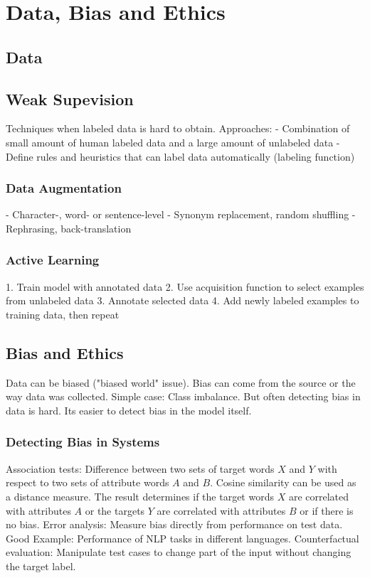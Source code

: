 \documentclass{scrartcl}
\begin{document}
\section*{Data, Bias and Ethics}
\subsection*{Data}
\subsection*{Weak Supevision}
Techniques when labeled data is hard to obtain.
Approaches:
- Combination of small amount of human labeled data and a large amount of unlabeled data
- Define rules and heuristics that can label data automatically (labeling function)

\subsubsection*{Data Augmentation}
- Character-, word- or sentence-level
- Synonym replacement, random shuffling
- Rephrasing, back-translation

\subsubsection*{Active Learning}
1. Train model with annotated data
2. Use acquisition function to select examples from unlabeled data
3. Annotate selected data
4. Add newly labeled examples to training data, then repeat

\subsection*{Bias and Ethics}
Data can be biased ("biased world" issue). Bias can come from the source or the way data was collected. Simple case: Class imbalance. But often detecting bias in data is hard. Its easier to detect bias in the model itself.
\subsubsection*{Detecting Bias in Systems}
Association tests:
Difference between two sets of target words $X$ and $Y$ with respect to two sets of attribute words $A$ and $B$. Cosine similarity can be used as a distance measure. The result determines if the target words $X$ are correlated with attributes $A$ or the targets $Y$ are correlated with attributes $B$ or if there is no bias.
Error analysis:
Measure bias directly from performance on test data. Good Example: Performance of NLP tasks in different languages.
Counterfactual evaluation: Manipulate test cases to change part of the input without changing the target label.
\end{document}
